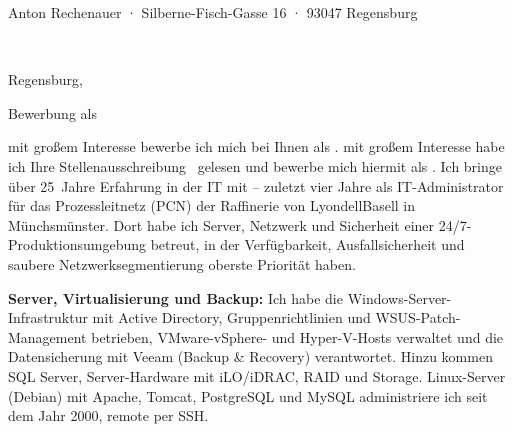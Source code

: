 \documentclass[11pt,a4paper]{article}
\newcommand*{\semibold}{\fontseries{sb}\selectfont}
\newcommand*{\heavy}{\fontseries{k}\selectfont}
\newcommand*{\optline}[1]{\ifdefempty{#1}{}{#1\\}}
\begin{document}
{\footnotesize\color{muted}Anton Rechenauer · Silberne-Fisch-Gasse 16 · 93047 Regensburg}\par
\vspace{2pt}
\begin{minipage}[t]{0.6\textwidth}
  \raggedright
  {\semibold\Firma}\\
  \optline{\Abteilung}%
  \optline{\Ansprechpartner}%
  \optline{\Strasse}%
  \Ort
\end{minipage}%
\hfill
\begin{minipage}[t]{0.35\textwidth}
  \raggedleft
  \vspace{0pt}\par
  Regensburg, \Datum
\end{minipage}

\vspace{1.0cm}

{\large\color{band}\heavy Bewerbung als \Stelle}\par
\vspace{-0.4em}
{\small\color{muted}%
  }\par

\vspace{0.6em}

\Anrede

\ifdefempty{\Quelle}
  {mit großem Interesse bewerbe ich mich bei Ihnen als \Stelle.}
  {mit großem Interesse habe ich Ihre Stellenausschreibung \Quelle\ gelesen und bewerbe mich
   hiermit als \Stelle.}
Ich bringe über 25~Jahre Erfahrung in der IT mit -- zuletzt vier Jahre als IT-Administrator
für das Prozessleitnetz (PCN) der Raffinerie von LyondellBasell in Münchsmünster. Dort habe
ich Server, Netzwerk und Sicherheit einer 24/7-Produktionsumgebung betreut, in der
Verfügbarkeit, Ausfallsicherheit und saubere Netzwerksegmentierung oberste Priorität haben.

\textbf{Server, Virtualisierung und Backup:} Ich habe die Windows-Server-Infrastruktur mit
Active Directory, Gruppenrichtlinien und WSUS-Patch-Management betrieben, VMware-vSphere- und
Hyper-V-Hosts verwaltet und die Datensicherung mit Veeam (Backup \& Recovery) verantwortet.
Hinzu kommen SQL Server, Server-Hardware mit iLO/iDRAC, RAID und Storage. Linux-Server
(Debian) mit Apache, Tomcat, PostgreSQL und MySQL administriere ich seit dem Jahr 2000,
remote per SSH.
\end{document}
